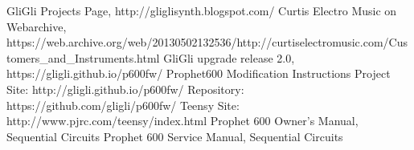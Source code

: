 \documentclass[draft,landscape, 11pt, oneside]{report}
\begin{document}
\begin{thebibliography}{50} 

GliGli Projects Page, http://gliglisynth.blogspot.com/
Curtis Electro Music on Webarchive, https://web.archive.org/web/20130502132536/http://curtiselectromusic.com/Customers\_and\_Instruments.html
GliGli upgrade release 2.0,  https://gligli.github.io/p600fw/
 Prophet600 Modification Instructions
 Project Site: http://gligli.github.io/p600fw/
 Repository: https://github.com/gligli/p600fw/
Teensy Site: http://www.pjrc.com/teensy/index.html
Prophet 600 Owner's Manual, Sequential Circuits
 Prophet 600 Service Manual, Sequential Circuits

\end{thebibliography}
\end{document}
